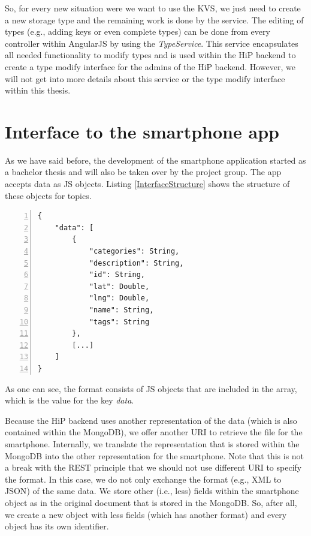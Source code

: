 So, for every new situation were we want to use the \ac{KVS}, we just need to create a new storage type and the remaining work is done by the service. The editing of types (e.g., adding keys or even complete types) can be done from every controller within AngularJS by using the \emph{TypeService}. This service encapsulates all needed functionality to modify types and is used within the \ac{HiP} backend to create a type modify interface for the admins of the \ac{HiP} backend. However, we will not get into more details about this service or the type modify interface within this thesis.

\section{Interface to the smartphone app}
As we have said before, the development of the smartphone application started as a bachelor thesis and will also be taken over by the project group. The app accepts data as \ac{JS} objects. Listing \ref{InterfaceStructure} shows the structure of these objects for topics. 

\begin{lstlisting}[numbers=left,caption={The format of topic files within the smartphone application.},label=InterfaceStructure,frame=tlbr,breaklines]
{
    "data": [
        {
            "categories": String,
            "description": String,
            "id": String,
            "lat": Double,
            "lng": Double,
            "name": String,
            "tags": String
        },
        [...]
    ]
}
\end{lstlisting}

As one can see, the format consists of \ac{JS} objects that are included in the array, which is the value for the key \emph{data}.  

Because the \ac{HiP} backend uses another representation of the data (which is also contained within the MongoDB), we offer another \ac{URI} to retrieve the file for the smartphone. Internally, we translate the representation that is stored within the MongoDB into the other representation for the smartphone. Note that this is not a break with the \ac{REST} principle that we should not use different \ac{URI} to specify the format. In this case, we do not only exchange the format (e.g., \ac{XML} to \ac{JSON}) of the same data. We store other (i.e., less) fields within the smartphone object as in the original document that is stored in the MongoDB. So, after all, we create a new object with less fields (which has another format) and every object has its own identifier. 


